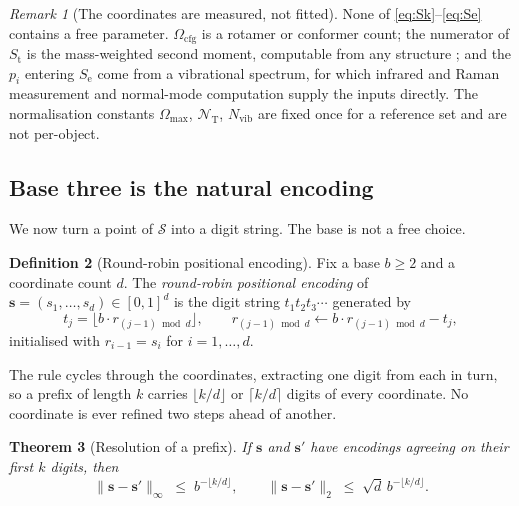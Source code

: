 \documentclass[11pt,twocolumn,a4paper]{article}
\theoremstyle{thmstyle}
\newtheorem{theorem}{Theorem}[section]
\theoremstyle{definition}
\newtheorem{definition}[theorem]{Definition}
\theoremstyle{remark}
\newtheorem{remark}[theorem]{Remark}
\newcommand{\St}{S_{\mathrm{t}}}
\newcommand{\Se}{S_{\mathrm{e}}}
\newcommand{\Sspace}{\mathcal{S}}
\newcommand{\Nvib}{N_{\mathrm{vib}}}
\newcommand{\norm}[1]{\lVert#1\rVert}
\begin{document}
\begin{remark}[The coordinates are measured, not fitted]
\label{rem:measured}
None of \eqref{eq:Sk}--\eqref{eq:Se} contains a free parameter.
$\Omega_{\mathrm{cfg}}$ is a rotamer or conformer count; the numerator
of $\St$ is the mass-weighted second moment, computable from any
structure \citep{berman2000,jumper2021}; and the $p_i$ entering $\Se$
come from a vibrational spectrum, for which infrared and Raman
measurement \citep{barth2007,barth2002,krimm1986} and normal-mode
computation \citep{go1983,tirion1996,bahar1997,bahar2010} supply the
inputs directly. The normalisation constants $\Omega_{\max}$,
$\mathcal{N}_{\mathrm{T}}$, $\Nvib$ are fixed once for a reference set
and are not per-object.
\end{remark}

\subsection{Base three is the natural encoding}

We now turn a point of $\Sspace$ into a digit string. The base is not
a free choice.

\begin{definition}[Round-robin positional encoding]
\label{def:positional}
Fix a base $b \geq 2$ and a coordinate count $d$. The
\emph{round-robin positional encoding} of
$\mathbf{s} = (s_1,\dots,s_d) \in [0,1]^d$ is the digit string
$t_1 t_2 t_3 \cdots$ generated by
\begin{equation}
  t_j = \bigl\lfloor b \cdot r_{(j-1)\bmod d} \bigr\rfloor,
  \qquad
  r_{(j-1)\bmod d} \leftarrow b \cdot r_{(j-1)\bmod d} - t_j,
  \label{eq:encoding}
\end{equation}
initialised with $r_{i-1} = s_i$ for $i = 1,\dots,d$.
\end{definition}

The rule cycles through the coordinates, extracting one digit from each
in turn, so a prefix of length $k$ carries $\lfloor k/d\rfloor$ or
$\lceil k/d\rceil$ digits of every coordinate. No coordinate is ever
refined two steps ahead of another.

\begin{theorem}[Resolution of a prefix]
\label{thm:prefix-resolution}
If $\mathbf{s}$ and $\mathbf{s}'$ have encodings agreeing on their
first $k$ digits, then
\begin{equation}
  \norm{\mathbf{s} - \mathbf{s}'}_\infty
    \;\leq\; b^{-\lfloor k/d\rfloor},
  \qquad
  \norm{\mathbf{s} - \mathbf{s}'}_2
    \;\leq\; \sqrt{d}\, b^{-\lfloor k/d\rfloor}.
  \label{eq:prefix-res}
\end{equation}
\end{theorem}
\end{document}
